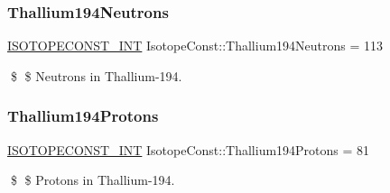 \subsubsection{\texorpdfstring{Thallium194\+Neutrons}{Thallium194Neutrons}}
{\footnotesize\ttfamily \mbox{\hyperlink{group___isotope_const-_macros_ga5f18360b3e99483a35c32d789e62621c}{I\+S\+O\+T\+O\+P\+E\+C\+O\+N\+S\+T\+\_\+\+I\+NT}} Isotope\+Const\+::\+Thallium194\+Neutrons = 113}

\$ \$ Neutrons in Thallium-\/194. \mbox{\label{group___isotope_const-_thallium-_tl194_ga6ac91287a86327bf6207a5cc874a7bcc}} 
\subsubsection{\texorpdfstring{Thallium194\+Protons}{Thallium194Protons}}
{\footnotesize\ttfamily \mbox{\hyperlink{group___isotope_const-_macros_ga5f18360b3e99483a35c32d789e62621c}{I\+S\+O\+T\+O\+P\+E\+C\+O\+N\+S\+T\+\_\+\+I\+NT}} Isotope\+Const\+::\+Thallium194\+Protons = 81}

\$ \$ Protons in Thallium-\/194. 